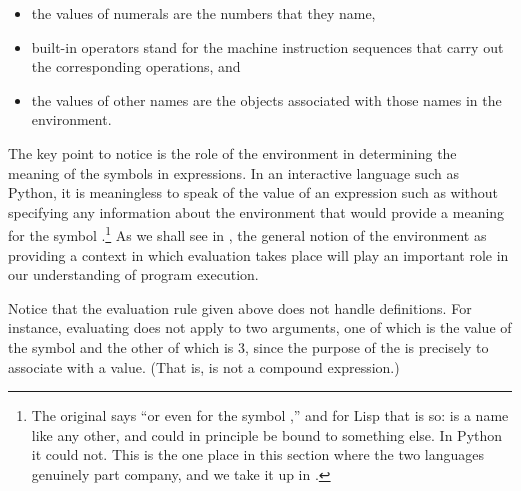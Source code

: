 \begin{itemize}
\item
the values of numerals are the numbers that they name,

\item
built-in operators stand for the machine instruction sequences that carry out
the corresponding operations, and

\item
the values of other names are the objects associated with those names in the
environment.
\end{itemize}

\noindent
The key point to notice is the role of the environment in determining the
meaning of the symbols in expressions.  In an interactive language such as
Python, it is meaningless to speak of the value of an expression such as
 without specifying any information about the environment that
would provide a meaning for the symbol .\footnote{The original says
``or even for the symbol \code{+},'' and for Lisp that is so: \code{+} is a
name like any other, and could in principle be bound to something else.  In
Python it could not.  This is the one place in this section where the two
languages genuinely part company, and we take it up in
.} As we shall see in , the general notion
of the environment as providing a context in which evaluation takes place will
play an important role in our understanding of program execution.

Notice that the evaluation rule given above does not handle definitions.  For
instance, evaluating  does not apply \code{=} to two arguments, one
of which is the value of the symbol  and the other of which is 3, since
the purpose of the \code{=} is precisely to associate  with a value.
(That is,  is not a compound expression.)

